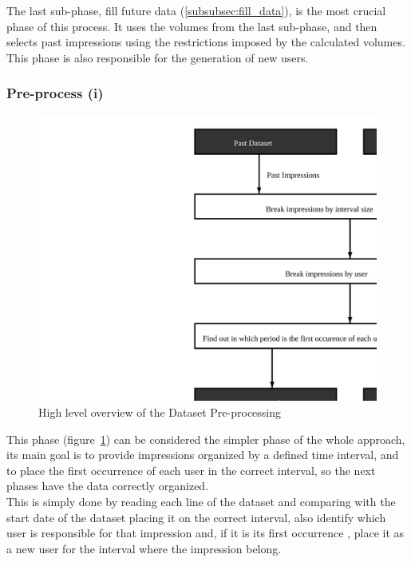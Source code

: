 The last sub-phase, fill future data (\ref{subsubsec:fill_data}), is the most
crucial phase of this process. It uses the volumes from the last sub-phase, and
then selects past impressions using the restrictions imposed by the calculated volumes. This
phase is also responsible for the generation of new users.

\subsubsection{Pre-process (i)}\label{subsubsec:pre_process}

\begin{figure}[h] \begin{center} \leavevmode
\includegraphics[]{pre_processing_i} \caption{ High level overview
of the Dataset Pre-processing} \label{fig:pre_processing_i} \end{center} \end{figure}

This phase (figure~\ref{fig:pre_processing_i}) can be considered the simpler phase of the whole approach, its main
goal is to provide impressions organized by a defined time interval, and to
place the first occurrence of each user in the correct interval, so the next
phases have the data correctly organized.
\\

This is simply done by reading each line of the dataset and comparing with the
start date of the dataset placing it on the correct interval, also identify
which user is responsible for that impression and, if it is its first occurrence
, place it as a new user for the interval where the impression belong.

